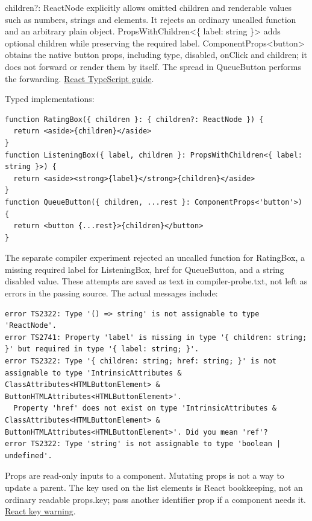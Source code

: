 \documentclass[
  10pt,
  a4paper,
  titlepage]{article}
\begin{document}
children?: ReactNode explicitly allows omitted children and renderable
values such as numbers, strings and elements. It rejects an ordinary
uncalled function and an arbitrary plain object.
PropsWithChildren\textless\{ label: string \}\textgreater{} adds
optional children while preserving the required label.
ComponentProps\textless\textquotesingle button\textquotesingle\textgreater{}
obtains the native button props, including type, disabled, onClick and
children; it does not forward or render them by itself. The spread in
QueueButton performs the forwarding.
\href{https://react.dev/learn/typescript}{React TypeScript guide}.

Typed implementations:

\Needspace{82.4pt}
\begin{lstlisting}[language=TSX]
function RatingBox({ children }: { children?: ReactNode }) {
  return <aside>{children}</aside>
}
function ListeningBox({ label, children }: PropsWithChildren<{ label: string }>) {
  return <aside><strong>{label}</strong>{children}</aside>
}
function QueueButton({ children, ...rest }: ComponentProps<'button'>) {
  return <button {...rest}>{children}</button>
}
\end{lstlisting}

The separate compiler experiment rejected an uncalled function for
RatingBox, a missing required label for ListeningBox, href for
QueueButton, and a string disabled value. These attempts are saved as
text in compiler-probe.txt, not left as errors in the passing source.
The actual messages include:

\Needspace{72.1pt}
\begin{lstlisting}
error TS2322: Type '() => string' is not assignable to type 'ReactNode'.
error TS2741: Property 'label' is missing in type '{ children: string; }' but required in type '{ label: string; }'.
error TS2322: Type '{ children: string; href: string; }' is not assignable to type 'IntrinsicAttributes & ClassAttributes<HTMLButtonElement> & ButtonHTMLAttributes<HTMLButtonElement>'.
  Property 'href' does not exist on type 'IntrinsicAttributes & ClassAttributes<HTMLButtonElement> & ButtonHTMLAttributes<HTMLButtonElement>'. Did you mean 'ref'?
error TS2322: Type 'string' is not assignable to type 'boolean | undefined'.
\end{lstlisting}

Props are read-only inputs to a component. Mutating props is not a way
to update a parent. The key used on the list elements is React
bookkeeping, not an ordinary readable props.key; pass another identifier
prop if a component needs it.
\href{https://react.dev/warnings/special-props}{React key warning}.
\end{document}
